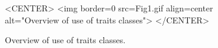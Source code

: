 \begin{figure}[t]
\begin{ccTexOnly}
\begin{center}
\leavevmode
\vspace*{6cm}
\hspace*{-2cm}
\end{center}
\vspace*{-8cm}
\end{ccTexOnly}
\caption{Overview of use of traits classes.
\label{ASPAS:Fig1}}
\begin{ccHtmlOnly}
<CENTER>
<img border=0 src=Fig1.gif align=center alt="Overview of use of traits classes">
</CENTER>
\end{ccHtmlOnly}
\end{figure}






